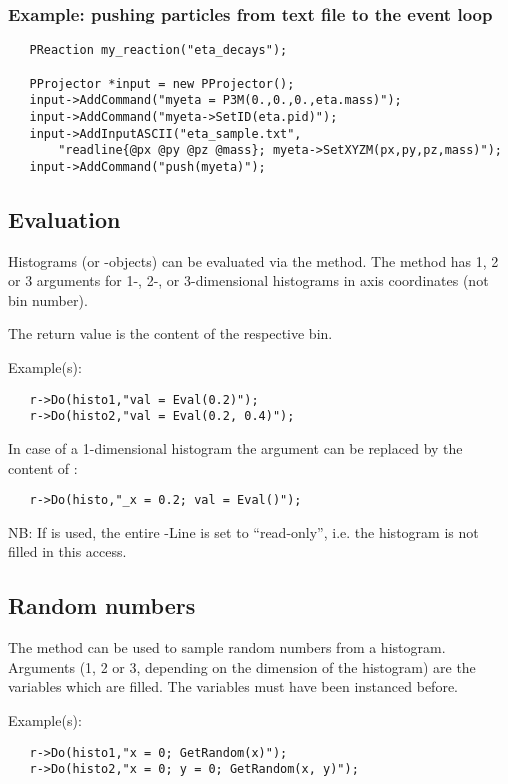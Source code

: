 {\subsubsection{Example: pushing particles from text file to the event loop}\label{subsub:push}

\begin{verbatim}
   PReaction my_reaction("eta_decays");
    
   PProjector *input = new PProjector();
   input->AddCommand("myeta = P3M(0.,0.,0.,eta.mass)");
   input->AddCommand("myeta->SetID(eta.pid)");
   input->AddInputASCII("eta_sample.txt", 
       "readline{@px @py @pz @mass}; myeta->SetXYZM(px,py,pz,mass)");
   input->AddCommand("push(myeta)");
\end{verbatim}


\subsection{Evaluation}

Histograms (or -objects) can be evaluated via
the  method. The  method has 1, 2 or 3 arguments for
1-, 2-, or 3-dimensional histograms in axis coordinates (not bin
number).

The return value is the content of the respective bin.

Example(s):
\begin{verbatim}
   r->Do(histo1,"val = Eval(0.2)"); 
   r->Do(histo2,"val = Eval(0.2, 0.4)"); 
\end{verbatim}

In case of a 1-dimensional histogram the argument can be replaced 
by the content of :
\begin{verbatim}
   r->Do(histo,"_x = 0.2; val = Eval()"); 
\end{verbatim}

NB: If  is used, the entire -Line is set to
``read-only'', i.e. the histogram is not filled in this access.

\subsection{Random numbers}

The  method can be used to sample random numbers from a
histogram. Arguments (1, 2 or 3, depending on the dimension of the
histogram) are the variables which are filled. The variables must have
been instanced before.

Example(s):
\begin{verbatim}
   r->Do(histo1,"x = 0; GetRandom(x)"); 
   r->Do(histo2,"x = 0; y = 0; GetRandom(x, y)"); 
\end{verbatim}

}
